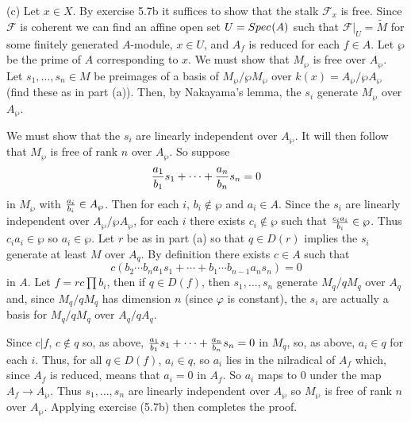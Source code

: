 \documentclass[12pt]{article}
\renewcommand{\sf}{\mathcal{F}}
\newcommand{\into}{\rightarrow}
\newcommand{\ru}{|_U}
\renewcommand{\phi}{\varphi}
\newcommand{\spec}{Spec \hspace{.01in}}
\begin{document}
(c) Let $x\in X$. By exercise 5.7b it suffices to
show that the stalk $\sf_x$ is free. Since $\sf$
is coherent we can find an affine open set 
$U=\spec(A)$ such that $\sf\ru=\tilde{M}$ for
some finitely generated $A$-module, $x\in U$,
and $A_f$ is reduced for each $f\in A$. Let
$\wp$ be the prime of $A$ corresponding to
$x$. We must show that $M_{\wp}$ is free over
$A_{\wp}$. Let $s_1,\ldots,s_n\in M$ be preimages
of a basis of $M_{\wp}/\wp M_{\wp}$ over
$k(x)=A_{\wp}/\wp A_{\wp}$ (find these
as in part (a)). Then, by Nakayama's lemma, the
$s_i$ generate $M_{\wp}$ over $A_{\wp}$. 

We must show that the $s_i$ are linearly
independent over $A_{\wp}$. It will then follow
that $M_{\wp}$ is free of rank $n$ over $A_{\wp}$.
So suppose 
$${a_1\over b_1}s_1+\cdots+{a_n\over b_n}s_n=0$$
in $M_{\wp}$ with ${a_i\over b_i}\in A_{\wp}$.
Then for each $i$, $b_i\not\in\wp$ and  
$a_i\in A$. Since the $s_i$ are linearly independent
over $A_{\wp}/\wp A_{\wp}$, for each $i$ there
exists $c_i\not\in\wp$ such that ${c_i a_i\over b_i}\in\wp$.
Thus $c_i a_i\in\wp$ so $a_i\in\wp$. 
Let $r$ be as in part (a) so that $q\in D(r)$ implies
the $s_i$ generate at least $M$ over $A_q$. 
By definition there exists $c\in A$ such that
$$c(b_2\cdots b_n a_1 s_1+\cdots+b_1\cdots b_{n-1} a_n s_n)=0$$
in $A$. 
Let $f=rc\prod b_i$, then if $q\in D(f)$, then 
$s_1,\ldots,s_n$ generate $M_q/qM_q$ over $A_q$ and, 
since $M_q/qM_q$ has dimension $n$ 
(since $\phi$ is constant), 
the $s_i$ are actually a basis for $M_q/qM_q$ over
$A_q/qA_q$.

Since $c|f$, $c\not\in q$ so, as above, 
${a_1\over b_1}s_1+\cdots+{a_n\over b_n}s_n=0$ in
$M_q$, so, as above, $a_i\in q$ for each $i$.  
Thus, for all $q\in D(f)$, $a_i\in q$, so
$a_i$ lies in the nilradical of $A_f$ which, since
$A_f$ is reduced, means that $a_i=0$ in $A_f$. 
So $a_i$ maps to $0$ under the map $A_f\into A_{\wp}$. 
Thus $s_1,\ldots,s_n$ are linearly independent
over $A_{\wp}$ so $M_{\wp}$ is free of rank $n$
over $A_{\wp}$. Applying exercise (5.7b) then completes
the proof.
 
    
\end{document}
